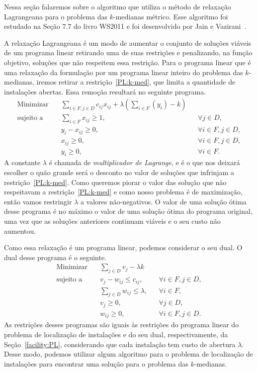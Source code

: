 Nessa seção falaremos sobre o algoritmo que utiliza o método de relaxação Lagrangeana para o problema das $k$-medianas métrico. Esse algoritmo foi estudado na Seção 7.7 do livro WS2011 e foi desenvolvido por Jain e Vazirani~\cite{JV}.

A relaxação Lagrangeana é um modo de aumentar o conjunto de soluções viáveis de um programa linear retirando uma de suas restrições e penalizando, na função objetivo, soluções que não respeitem essa restrição. Para o programa linear que é uma relaxação da formulação por um programa linear inteiro do problema das $k$-medianas, iremos retirar a restrição~\eqref{PL:k-med}, que limita a quantidade de instalações abertas. Essa remoção resultará no seguinte programa.
\begin{align*}
    \text{Minimizar} \quad & \sum_{i \in F, j \in D} c_{ij}x_{ij} + \lambda \left(\sum_{i \in F} (y_i) - k\right)\label{RL} \tag{RL} \\
    \text{sujeito a} \quad & \sum_{i \in F} x_{ij} \geq 1, &&\forall j \in D, \\
                           & y_i - x_{ij} \geq 0, &&\forall i \in F, j \in D, \\
                           & x_{ij} \geq 0, && \forall i \in F,j \in D, \\
                           & y_i \geq 0, &&\forall i \in F.
\end{align*}
A constante $\lambda$ é chamada de \emph{multiplicador de Lagrange}, e é o que nos deixará escolher o quão grande será o desconto no valor de soluções que infrinjam a restrição~\eqref{PL:k-med}.
Como queremos piorar o valor das solução que não respeitavam a restrição~\eqref{PL:k-med} e como nosso problema é de maximização, então vamos restringir $\lambda$ a valores não-negativos.
O valor de uma solução ótima desse programa é no máximo o valor de uma solução ótima do programa original, uma vez que as soluções anteriores continuam viáveis e o seu custo não aumentou.

Como essa relaxação é um programa linear, podemos considerar o seu dual. O dual desse programa é o seguinte.
\begin{align*}
    \text{Minimizar} \quad & \sum_{j \in D} v_j - \lambda k \label{DL} \tag{DL}\\
    \text{sujeito a} \quad & v_j - w_{ij} \leq c_{ij}, &&\forall i \in F, j\in D, \\
                           & \sum_{j\in D} w_{ij} \leq \lambda, &&\forall i \in F, \\
                           & v_j \geq 0, &&\forall j\in D, \\
                           & w_{ij} \geq 0, && \forall i \in F,j \in D.
\end{align*}
As restrições desses programas são iguais às restrições do programa linear do problema de localização de instalações e do seu dual, respectivamente, da Seção~\ref{facility:PL}, considerando que cada instalação tem custo de abertura $\lambda$.
Desse modo, podemos utilizar algum algoritmo para o problema de localização de instalações para encontrar uma solução para o problema das $k$-medianas. 

